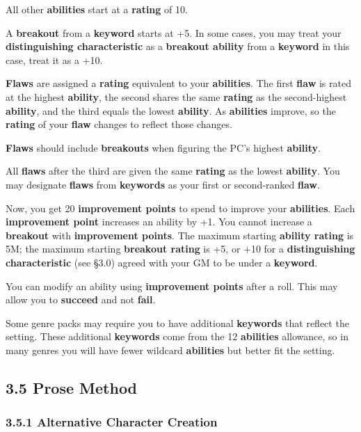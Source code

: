 \documentclass[
  11pt,
]{article}
\begin{document}
All other \textbf{abilities} start at a \textbf{rating} of 10.

A \textbf{breakout} from a \textbf{keyword} starts at +5. In some cases,
you may treat your \textbf{distinguishing characteristic} as a
\textbf{breakout ability} from a \textbf{keyword} in this case, treat it
as a +10.

\textbf{Flaws} are assigned a \textbf{rating} equivalent to your
\textbf{abilities}. The first \textbf{flaw} is rated at the highest
\textbf{ability}, the second shares the same \textbf{rating} as the
second-highest \textbf{ability}, and the third equals the lowest
\textbf{ability}. As \textbf{abilities} improve, so the \textbf{rating}
of your \textbf{flaw} changes to reflect those changes.

\textbf{Flaws} should include \textbf{breakouts} when figuring the PC's
highest \textbf{ability}.

All \textbf{flaws} after the third are given the same \textbf{rating} as
the lowest \textbf{ability}. You may designate \textbf{flaws} from
\textbf{keywords} as your first or second-ranked \textbf{flaw}.

Now, you get 20 \textbf{improvement points} to spend to improve your
\textbf{abilities}. Each \textbf{improvement point} increases an ability
by +1. You cannot increase a \textbf{breakout} with \textbf{improvement
points}. The maximum starting \textbf{ability rating} is 5M; the maximum
starting \textbf{breakout rating} is +5, or +10 for a
\textbf{distinguishing characteristic} (see §3.0) agreed with your GM to
be under a \textbf{keyword}.

You can modify an ability using \textbf{improvement points} after a
roll. This may allow you to \textbf{succeed} and not \textbf{fail}.

Some genre packs may require you to have additional \textbf{keywords}
that reflect the setting. These additional \textbf{keywords} come from
the 12 \textbf{abilities} allowance, so in many genres you will have
fewer wildcard \textbf{abilities} but better fit the setting.

\hypertarget{prose-method}{%
\subsection{3.5 Prose Method}\label{prose-method}}

\hypertarget{alternative-character-creation}{%
\subsubsection{3.5.1 Alternative Character
Creation}\label{alternative-character-creation}}
\end{document}
